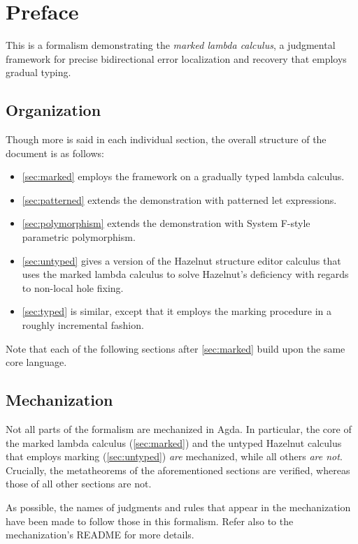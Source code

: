 \documentclass[supplement.tex]{subfiles}
\begin{document}
\section{Preface}
\label{sec:preface}
This is a formalism demonstrating the \emph{marked lambda calculus}, a judgmental framework for
precise bidirectional error localization and recovery that employs gradual typing.

\subsection{Organization}
Though more is said in each individual section, the overall structure of the document is as follows:
%
\begin{itemize}
  \item \cref{sec:marked} employs the framework on a gradually typed lambda calculus.

  \item \cref{sec:patterned} extends the demonstration with patterned let expressions.

  \item \cref{sec:polymorphism} extends the demonstration with System F-style parametric
    polymorphism.

  \item \cref{sec:untyped} gives a version of the Hazelnut structure editor calculus that uses the
    marked lambda calculus to solve Hazelnut's deficiency with regards to non-local hole fixing.

  \item \cref{sec:typed} is similar, except that it employs the marking procedure in a roughly
    incremental fashion.
\end{itemize}
%
Note that each of the following sections after \cref{sec:marked} build upon the same core language.

\subsection{Mechanization}
Not all parts of the formalism are mechanized in Agda. In particular, the core of the marked lambda
calculus (\cref{sec:marked}) and the untyped Hazelnut calculus that employs marking
(\cref{sec:untyped}) \emph{are} mechanized, while all others \emph{are not}. Crucially, the
metatheorems of the aforementioned sections are verified, whereas those of all other sections are
not.

As possible, the names of judgments and rules that appear in the mechanization have been made to
follow those in this formalism. Refer also to the mechanization's README for more details.
\end{document}
